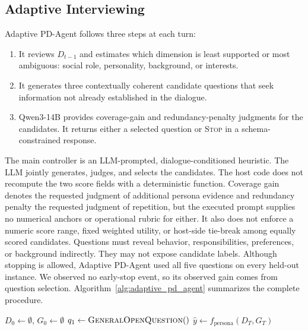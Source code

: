 \documentclass{ieeeaccess}
\begin{document}
\subsection{Adaptive Interviewing}
Adaptive PD-Agent follows three steps at each turn:
\begin{enumerate}
    \item It reviews $D_{t-1}$ and estimates which dimension is least supported or most
    ambiguous: social role, personality, background, or interests.
    \item It generates three contextually coherent candidate questions that seek
    information not already established in the dialogue.
    \item Qwen3-14B provides coverage-gain and redundancy-penalty judgments for the
    candidates. It returns either a selected question or \textsc{Stop} in a
    schema-constrained response.
\end{enumerate}
The main controller is an LLM-prompted, dialogue-conditioned heuristic. The LLM jointly
generates, judges, and selects the candidates. The host code does not recompute the two
score fields with a deterministic function. Coverage gain denotes the requested judgment
of additional persona evidence and redundancy penalty the requested judgment of repetition,
but the executed prompt supplies no numerical anchors or operational rubric for either.
It also does not enforce a numeric score range,
fixed weighted utility, or host-side tie-break among equally scored candidates.
Questions must reveal behavior, responsibilities, preferences, or background indirectly.
They may not expose candidate labels. Although stopping is allowed, Adaptive PD-Agent used
all five questions on every held-out instance. We observed no early-stop event, so its
observed gain comes from question selection.
Algorithm~\ref{alg:adaptive_pd_agent} summarizes the complete procedure.

\begin{algorithm}[!t]
\caption{Adaptive PD-Agent Interview and Persona Prediction}
\label{alg:adaptive_pd_agent}
\small
{}
$D_0\leftarrow\emptyset$, $G_0\leftarrow\emptyset$\;
$q_1\leftarrow\textsc{GeneralOpenQuestion}()$\;
$\hat{y}\leftarrow f_{\mathrm{persona}}(D_T,G_T)$\;
\;
\end{algorithm}
\end{document}

